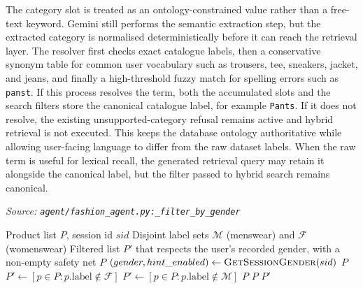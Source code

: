 The category slot is treated as an ontology-constrained value rather than a free-text keyword. Gemini still performs the semantic extraction step, but the extracted category is normalised deterministically before it can reach the retrieval layer. The resolver first checks exact catalogue labels, then a conservative synonym table for common user vocabulary such as trousers, tee, sneakers, jacket, and jeans, and finally a high-threshold fuzzy match for spelling errors such as \texttt{panst}. If this process resolves the term, both the accumulated slots and the search filters store the canonical catalogue label, for example \texttt{Pants}. If it does not resolve, the existing unsupported-category refusal remains active and hybrid retrieval is not executed. This keeps the database ontology authoritative while allowing user-facing language to differ from the raw dataset labels. When the raw term is useful for lexical recall, the generated retrieval query may retain it alongside the canonical label, but the filter passed to hybrid search remains canonical.

\begin{algorithm}[H]
\caption{Filter Products by Recorded Session Gender}\label{alg:filter_gender}
\textit{Source: \texttt{agent/fashion\_agent.py:\_filter\_by\_gender}}
\begin{algorithmic}[1]
\Require Product list $P$, session id $sid$
\Require Disjoint label sets $\mathcal{M}$ (menswear) and $\mathcal{F}$ (womenswear)
\Ensure Filtered list $P'$ that respects the user's recorded gender, with a non-empty safety net
    \State \Return $P$\EndIf
    \State $(gender, hint\_enabled) \gets \textsc{GetSessionGender}(sid)$
    \State \Return $P$\EndIf
    \State $P' \gets [p \in P : p.\text{label} \notin \mathcal{F}]$
    \State $P' \gets [p \in P : p.\text{label} \notin \mathcal{M}]$
    \Else\State \Return $P$
    \EndIf
    \State \Return $P$ \EndIf
    \State \Return $P'$
\EndFunction
\end{algorithmic}
\end{algorithm}

